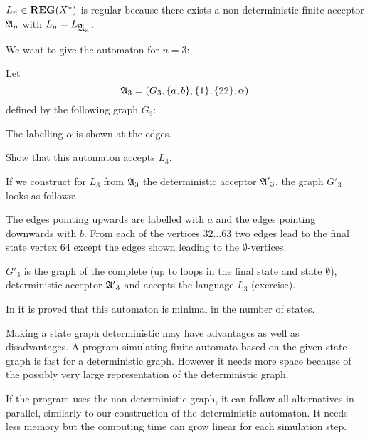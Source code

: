 $L_n \in \mbox{{\bf REG}}(X^*)$ is regular because there exists a non-deterministic
finite acceptor $\mbox{$\mathfrak{A}$}_{n}$ with $L_n = L_{\mbox{$\mathfrak{A}$}_{n}}$.

We want to give the automaton for $n = 3$:

Let 
\[ \mbox{$\mathfrak{A}$}_3 = (G_3, \mbox{$\{a,b\}$}, \mbox{$\{1\}$}, \mbox{$\{22\}$}, \alpha) \]
defined by the following graph $G_3$:

\begin{center}

\end{center}

The labelling $\alpha$ is shown at the edges.

\begin{exercise}
Show that this automaton accepts $L_3$.
\end{exercise}

If we construct for $L_3$ from $\mbox{$\mathfrak{A}$}_3$ the deterministic acceptor
$\mbox{$\mathfrak{A'}$}_3$, the graph $G'_3$ looks as follows:

\begin{center}
\begin{tiny}

\end{tiny}
\end{center}

The edges pointing upwards are labelled with $a$ and the edges pointing
downwards with $b$. From each of the vertices $32 \ldots 63$ two edges lead to the final
state vertex $64$ except the edges shown leading to the $\emptyset$-vertices.

$G'_3$ is the graph of the complete (up to loops in the final state and state
$\emptyset$), deterministic acceptor $\mbox{$\mathfrak{A'}$}_3$ and accepts the language $L_3$
(exercise).

In \cite{Commentz} it is proved that this automaton is minimal in the number of
states.

\bigskip
Making a state graph deterministic may have advantages as well as disadvantages.
A program simulating finite automata based on the given state graph is fast for
a deterministic graph. However it needs more space because of the possibly very
large representation of the deterministic graph.

If the program uses the non-deterministic graph, it can follow all alternatives
in parallel, similarly to our construction of the deterministic automaton. It
needs less memory but the computing time can grow linear for each simulation step.

